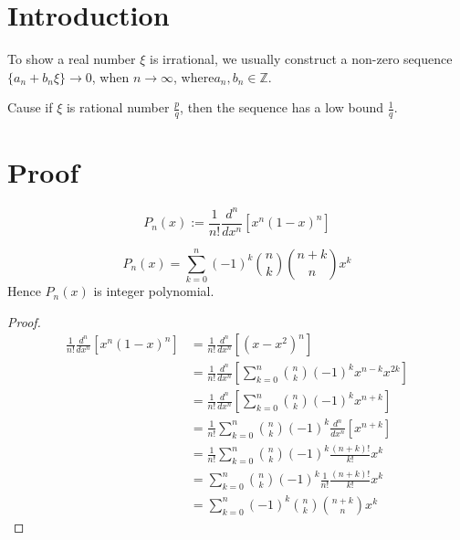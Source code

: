 %

\chapter{Introduction}

To show a real number $\xi$ is irrational, we usually construct a non-zero sequence 
$\{a_n + b_n\xi\} \rightarrow 0$, when $n \rightarrow \infty$, where$a_n, b_n \in \mathbb{Z}$.

Cause if $\xi$ is rational number $\frac{p}{q}$, then the sequence has a low bound $\frac{1}{q}$.

\chapter{Proof}

\begin{definition}\label{shiftedLegendre}
    \leanok
    \[ P_n(x):=\frac{1}{n!}\frac{d^n}{dx^n}[x^n(1-x)^n] \]
\end{definition}

\begin{lemma}\label{shiftedLegendre_eq_sum}
    \[ P_n(x)=\sum\limits_{k=0}^{n}(-1)^k\binom{n}{k}\binom{n+k}{n}x^k \]
    Hence $P_n(x)$ is integer polynomial.
\end{lemma}
\begin{proof}
    \leanok
    \begin{align*}
        \frac{1}{n!}\frac{d^n}{dx^n}[x^n(1-x)^n] &= \frac{1}{n!}\frac{d^n}{dx^n}[(x-x^2)^n]\\
        &= \frac{1}{n!}\frac{d^n}{dx^n}[\sum\limits_{k=0}^{n} \binom{n}{k}(-1)^k x^{n-k}x^{2k}]\\
        &= \frac{1}{n!}\frac{d^n}{dx^n}[\sum\limits_{k=0}^{n} \binom{n}{k}(-1)^k x^{n+k}]\\
        &= \frac{1}{n!}\sum\limits_{k=0}^{n} \binom{n}{k}(-1)^k \frac{d^n}{dx^n}[x^{n+k}]\\
        &= \frac{1}{n!}\sum\limits_{k=0}^{n} \binom{n}{k}(-1)^k \frac{(n+k)!}{k!}x^{k}\\
        &= \sum\limits_{k=0}^{n} \binom{n}{k}(-1)^k \frac{1}{n!}\frac{(n+k)!}{k!}x^{k}\\
        &= \sum\limits_{k=0}^{n} (-1)^k \binom{n}{k}\binom{n+k}{n}x^{k}
    \end{align*}
\end{proof}

